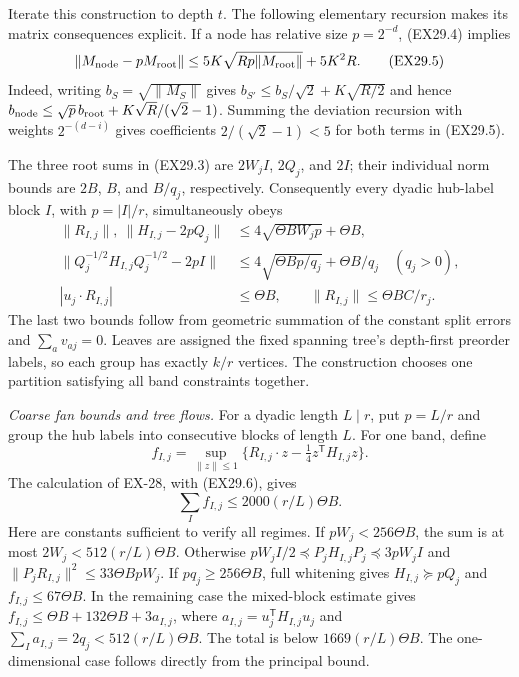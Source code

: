 Iterate this construction to depth $t$. The following elementary
recursion makes its matrix consequences explicit. If a node has
relative size $p=2^{-d}$, (EX29.4) implies
\[
 \|M_{\rm node}-pM_{\rm root}\|
 \le5K\sqrt{Rp\|M_{\rm root}\|}+5K^2R.
 \tag{EX29.5}
\]
Indeed, writing $b_S=\sqrt{\|M_S\|}$ gives
$b_{S'}\le b_S/\sqrt2+K\sqrt{R/2}$ and hence
$b_{\rm node}\le\sqrt p\,b_{\rm root}
 +K\sqrt R/(\sqrt2-1)$.
Summing the deviation recursion with weights
$2^{-(d-i)}$ gives coefficients
$2/(\sqrt2-1)<5$ for both terms in (EX29.5).

The three root sums in (EX29.3) are $2W_jI$, $2Q_j$,
and $2I$; their individual norm bounds are $2B$, $B$,
and $B/q_j$, respectively. Consequently every dyadic
hub-label block $I$, with $p=|I|/r$, simultaneously obeys
\begin{align*}
 \|R_{I,j}\|,\ \|H_{I,j}-2pQ_j\|
     &\le4\sqrt{\Theta BW_jp}+\Theta B,\\
 \|Q_j^{-1/2}H_{I,j}Q_j^{-1/2}-2pI\|
     &\le4\sqrt{\Theta Bp/q_j}+\Theta B/q_j
                              \quad(q_j>0),\\
 |u_j\cdot R_{I,j}|&\le\Theta B,
       \qquad \|R_{I,j}\|\le\Theta BC/r_j.
 \tag{EX29.6}
\end{align*}
The last two bounds follow from geometric summation of the
constant split errors and $\sum_av_{aj}=0$. Leaves are
assigned the fixed spanning tree's depth-first preorder labels,
so each group has exactly $k/r$ vertices. The construction
chooses one partition satisfying all band constraints together.

\emph{Coarse fan bounds and tree flows.}
For a dyadic length $L\mid r$, put $p=L/r$ and group the
hub labels into consecutive blocks of length $L$. For one band,
define
\[
 f_{I,j}=\sup_{\|z\|\le1}
       \{R_{I,j}\cdot z-\tfrac14z^{\mathsf T}H_{I,j}z\}.
\]
The calculation of EX-28, with (EX29.6), gives
\[
 \sum_I f_{I,j}\le2000(r/L)\Theta B.
 \tag{EX29.7}
\]
Here are constants sufficient to verify all regimes. If
$pW_j<256\Theta B$, the sum is at most
$2W_j<512(r/L)\Theta B$. Otherwise
$pW_jI/2\preceq P_jH_{I,j}P_j\preceq3pW_jI$ and
$\|P_jR_{I,j}\|^2\le33\Theta BpW_j$.
If $pq_j\ge256\Theta B$, full whitening gives
$H_{I,j}\succeq pQ_j$ and $f_{I,j}\le67\Theta B$.
In the remaining case the mixed-block estimate gives
$f_{I,j}\le\Theta B+132\Theta B+3a_{I,j}$,
where $a_{I,j}=u_j^{\mathsf T}H_{I,j}u_j$ and
$\sum_Ia_{I,j}=2q_j<512(r/L)\Theta B$.
The total is below $1669(r/L)\Theta B$.
The one-dimensional case follows directly from the principal
bound.

